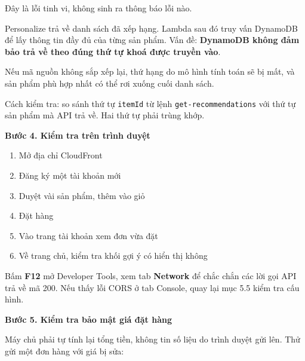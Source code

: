 Đây là lỗi tinh vi, không sinh ra thông báo lỗi nào.

Personalize trả về danh sách đã xếp hạng. Lambda sau đó truy vấn
DynamoDB để lấy thông tin đầy đủ của từng sản phẩm. Vấn đề:
\textbf{DynamoDB không đảm bảo trả về theo đúng thứ tự khoá được truyền
vào}.

Nếu mã nguồn không sắp xếp lại, thứ hạng do mô hình tính toán sẽ bị mất,
và sản phẩm phù hợp nhất có thể rơi xuống cuối danh sách.

Cách kiểm tra: so sánh thứ tự \texttt{itemId} từ lệnh
\texttt{get-recommendations} với thứ tự sản phẩm mà API trả về. Hai thứ
tự phải trùng khớp.

\vspace{0.5em}\noindent\textbf{Bước 4. Kiểm tra trên trình
duyệt}\par

\begin{enumerate}
\def\labelenumi{\arabic{enumi}.}
\tightlist
\item
  Mở địa chỉ CloudFront
\item
  Đăng ký một tài khoản mới
\item
  Duyệt vài sản phẩm, thêm vào giỏ
\item
  Đặt hàng
\item
  Vào trang tài khoản xem đơn vừa đặt
\item
  Về trang chủ, kiểm tra khối gợi ý có hiển thị không
\end{enumerate}

Bấm \textbf{F12} mở Developer Tools, xem tab \textbf{Network} để chắc
chắn các lời gọi API trả về mã 200. Nếu thấy lỗi CORS ở tab Console,
quay lại mục 5.5 kiểm tra cấu hình.

\vspace{0.5em}\noindent\textbf{Bước 5. Kiểm tra bảo mật giá đặt
hàng}\par

Máy chủ phải tự tính lại tổng tiền, không tin số liệu do trình duyệt gửi
lên. Thử gửi một đơn hàng với giá bị sửa:

\begin{Shaded}
\begin{Highlighting}[]
 \DataTypeTok{\textbackslash{}}
    \DataTypeTok{\textbackslash{}}
    \DataTypeTok{\textbackslash{}}
   
\end{Highlighting}
\end{Shaded}

